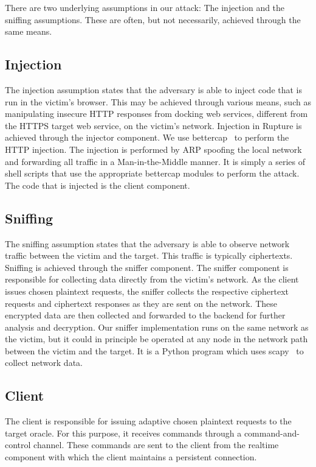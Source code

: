 \documentclass[a4paper, 11 pt, conference]{article}
\begin{document}
There are two underlying assumptions in our attack: The injection and the sniffing assumptions. These are often, but not necessarily, achieved through the same means.

\subsection{Injection}
The injection assumption states that the adversary is able to inject code that is run in the victim's browser. This may be achieved through various means, such as manipulating insecure HTTP responses from docking web services, different from the HTTPS target web service, on the victim’s network. Injection in Rupture is achieved through the injector component. We use bettercap~\cite{c10} to perform the HTTP injection. The injection is performed by ARP spoofing the local network and forwarding all traffic in a Man-in-the-Middle manner. It is simply a series of shell scripts that use the appropriate bettercap modules to perform the attack. The code that is injected is the client component. 

\subsection{Sniffing}
The sniffing assumption states that the adversary is able to observe network traffic between the victim and the target. This traffic is typically ciphertexts. Sniffing is achieved through the sniffer component. The sniffer component is responsible for collecting data directly from the victim's network. As the client issues chosen plaintext requests, the sniffer collects the respective ciphertext requests and ciphertext responses as they are sent on the network. These encrypted data are then collected and forwarded to the backend for further analysis and decryption. Our sniffer implementation runs on the same network as the victim, but it could in principle be operated at any node in the network path between the victim and the target. It is a Python program which uses scapy~\cite{c12} to collect network data.

\subsection{Client}
The client is responsible for issuing adaptive chosen plaintext requests to the target oracle. For this purpose, it receives commands through a command-and-control channel. These commands are sent to the client from the realtime component with which the client maintains a persistent connection.
\end{document}
